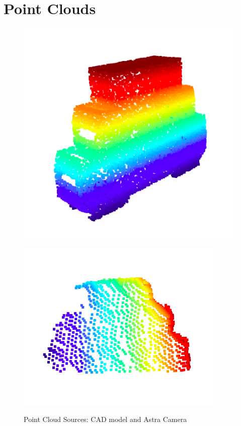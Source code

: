 \appendix
\chapter*{Point Clouds}
\label{chap:pointclouds}


\begin{figure}[htp]
\begin{center}
{
  \includegraphics[clip,width=0.6\columnwidth]{images/cad_cloud.png}
}
\end{center}
\begin{center}
{
  \includegraphics[clip,width=0.6\columnwidth]{images/astra_cloud.png}
}
\end{center}
\caption{Point Cloud Sources: CAD model and Astra Camera}
\label{cadastracloud}
\end{figure}





